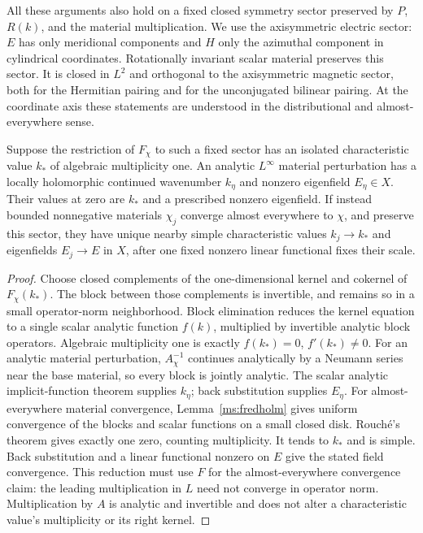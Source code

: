 All these arguments also hold on a fixed closed symmetry sector
preserved by $P$, $R(k)$, and the material multiplication.  We use
the axisymmetric electric sector: $E$ has only meridional components
and $H$ only the azimuthal component in cylindrical coordinates.
Rotationally invariant scalar material preserves this sector.
It is closed in $L^2$ and orthogonal to the axisymmetric magnetic
sector, both for the Hermitian pairing and for the unconjugated
bilinear pairing.  At the coordinate axis these statements are
understood in the distributional and almost-everywhere sense.

\begin{lemma}
\label{ms:continuation}
Suppose the restriction of $F_\chi$ to such a fixed sector has an
isolated characteristic value $k_*$ of algebraic multiplicity one.
An analytic $L^\infty$ material perturbation has a locally
holomorphic continued wavenumber $k_\eta$ and nonzero eigenfield
$E_\eta\in X$.  Their values at zero are $k_*$ and a prescribed
nonzero eigenfield.  If instead bounded nonnegative materials
$\chi_j$ converge almost everywhere to $\chi$, and preserve this
sector, they have unique nearby simple characteristic values
$k_j\to k_*$ and eigenfields $E_j\to E$ in $X$, after one fixed
nonzero linear functional fixes their scale.
\end{lemma}

\begin{proof}
Choose closed complements of the one-dimensional kernel and
cokernel of $F_\chi(k_*)$.  The block between those complements
is invertible, and remains so in a small operator-norm neighborhood.
Block elimination reduces the kernel equation to a single scalar
analytic function $f(k)$, multiplied by invertible analytic block
operators.  Algebraic multiplicity one is exactly
$f(k_*)=0$, $f'(k_*)\ne0$.
For an analytic material perturbation, $A_\chi^{-1}$ continues
analytically by a Neumann series near the base material, so every
block is jointly analytic.  The scalar analytic implicit-function
theorem supplies $k_\eta$; back substitution supplies $E_\eta$.
For almost-everywhere material convergence, Lemma~\ref{ms:fredholm}
gives uniform convergence of the blocks and scalar functions on a
small closed disk.  Rouch\'e's theorem gives exactly one zero,
counting multiplicity.  It tends to $k_*$ and is simple.  Back
substitution and a linear functional nonzero on $E$ give the stated
field convergence.  This reduction must use $F$ for the
almost-everywhere convergence claim: the leading multiplication
in $L$ need not converge in operator norm.  Multiplication by $A$
is analytic and invertible and does not alter a characteristic
value's multiplicity or its right kernel.
\end{proof}

